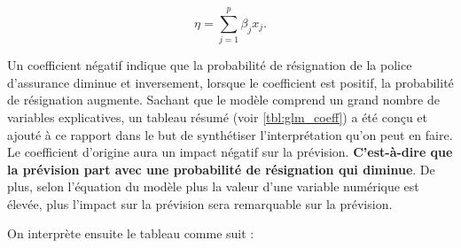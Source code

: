 \documentclass[]{article}
\begin{document}
\[\eta = \sum\limits_{j=1}^p \beta_{j} x_{j}.\]

Un coefficient négatif indique que la probabilité de résignation de la
police d'assurance diminue et inversement, lorsque le coefficient est
positif, la probabilité de résignation augmente. Sachant que le modèle
comprend un grand nombre de variables explicatives, un tableau résumé
(voir \autoref{tbl:glm_coeff}) a été conçu et ajouté à ce rapport dans
le but de synthétiser l'interprétation qu'on peut en faire. Le
coefficient d'origine aura un impact négatif sur la prévision.
\textbf{C'est-à-dire que la prévision part avec une probabilité de
résignation qui diminue}. De plus, selon l'équation du modèle plus la
valeur d'une variable numérique est élevée, plus l'impact sur la
prévision sera remarquable sur la prévision.

On interprète ensuite le tableau comme suit :
\end{document}
